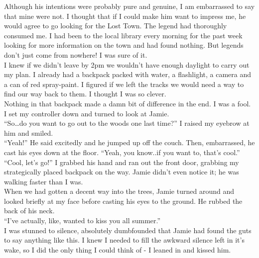 \documentclass[a5paper]{scrartcl}
\begin{document}
Although his intentions were probably pure and genuine, I am embarrassed to say that mine were not. I thought that if I could make him want to impress me, he would agree to go looking for the Lost Town. The legend had thoroughly consumed me. I had been to the local library every morning for the past week looking for more information on the town and had found nothing. But legends don't just come from nowhere! I was sure of it.\\


I knew if we didn't leave by 2pm we wouldn't have enough daylight to carry out my plan. I already had a backpack packed with water, a flashlight, a camera and a can of red spray-paint. I figured if we left the tracks we would need a way to find our way back to them. I thought I was so clever. \\


Nothing in that backpack made a damn bit of difference in the end. I was a fool.    \\


I set my controller down and turned to look at Jamie. \\


\enquote{So\dots do you want to go out to the woods one last time?} I raised my eyebrow at him and smiled. \\


\enquote{Yeah!} He said excitedly and he jumped up off the couch. Then, embarrassed, he cast his eyes down at the floor. \enquote{Yeah, you know..if you want to, that's cool.}\\


\enquote{Cool, let's go!} I grabbed his hand and ran out the front door, grabbing my strategically placed backpack on the way. Jamie didn't even notice it; he was walking faster than I was.\\


When we had gotten a decent way into the trees, Jamie turned around and looked briefly at my face before casting his eyes to the ground. He rubbed the back of his neck.\\


\enquote{I've actually, like, wanted to kiss you all summer.}\\


I was stunned to silence, absolutely dumbfounded that Jamie had found the guts to say anything like this. I knew I needed to fill the awkward silence left in it's wake, so I did the only thing I could think of - I leaned in and kissed him. \\
\end{document}
